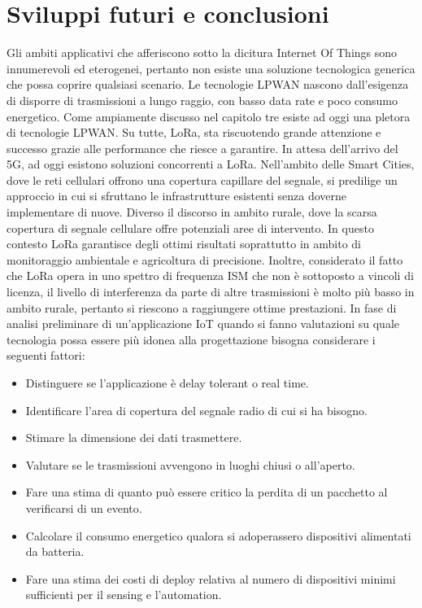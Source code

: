 \documentclass[12pt,a4paper,openright,twoside]{report}
\begin{document}
\chapter{Sviluppi futuri e conclusioni}
Gli ambiti applicativi che afferiscono sotto la dicitura Internet Of Things sono innumerevoli ed eterogenei, pertanto non esiste una soluzione tecnologica generica che possa coprire qualsiasi scenario. 
Le tecnologie LPWAN nascono dall'esigenza di disporre di trasmissioni a lungo raggio, con basso data rate e poco consumo energetico. Come ampiamente discusso nel capitolo tre esiste ad oggi una pletora di tecnologie LPWAN. Su tutte, LoRa, sta riscuotendo grande attenzione e successo grazie alle performance che riesce a garantire.
In attesa dell'arrivo del 5G, ad oggi esistono soluzioni concorrenti a LoRa.
Nell'ambito delle Smart Cities, dove le reti cellulari offrono una copertura capillare del segnale, si predilige un approccio in cui si sfruttano le infrastrutture esistenti senza doverne implementare di nuove. Diverso il discorso in ambito rurale, dove la scarsa copertura di segnale cellulare offre potenziali aree di intervento. In questo contesto LoRa garantisce degli ottimi risultati soprattutto in ambito di monitoraggio ambientale e agricoltura di precisione. Inoltre, considerato il fatto che LoRa opera in uno spettro di frequenza ISM che non \`e sottoposto a vincoli di licenza, il livello di interferenza da parte di altre trasmissioni \`e molto pi\`u basso in ambito rurale, pertanto si riescono a raggiungere ottime prestazioni.    
In fase di analisi preliminare di un'applicazione IoT quando si fanno valutazioni su quale tecnologia possa essere pi\`u idonea alla progettazione bisogna considerare i seguenti fattori:
 \begin{itemize}                       
\item Distinguere se l'applicazione \`e delay tolerant o real time.
\item Identificare l'area di copertura del segnale radio di cui si ha bisogno.
\item Stimare la dimensione dei dati trasmettere.
\item Valutare se le trasmissioni avvengono in luoghi chiusi o all'aperto.
\item Fare una stima di quanto pu\`o essere critico la perdita di un pacchetto al verificarsi di un evento.
\item Calcolare il consumo energetico qualora si adoperassero dispositivi alimentati da batteria.
\item Fare una stima dei costi di deploy relativa al numero di dispositivi minimi sufficienti per il sensing e l'automation.
\end{itemize}
\end{document}
